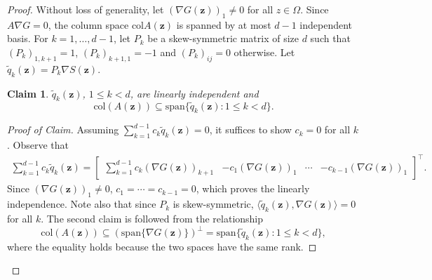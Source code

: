 \documentclass[openacc]{rsproca_new}%
\newcommand{\z}{\bm{z}}
\newtheorem{claim}{Claim}
\begin{document}
\begin{proof}
    Without loss of generality, let $(\nabla G(\z))_1 \ne 0$ for all $z \in \Omega$.
    Since $A\nabla G = 0$, 
    the column space $\text{col} A(\z)$ is spanned by at most $d-1$ independent basis.
    For $k=1,\dots,d-1$, let $P_k$ be a skew-symmetric matrix of size $d$ such that 
    $(P_k)_{1,k+1} = 1$, $(P_k)_{k+1,1}=-1$ and $(P_k)_{ij}=0$ otherwise.
    Let $\tilde{q}_k(\z) = P_k\nabla S(\z)$. 
    \begin{claim}
        $\tilde{q}_k(\z)$, $1\le k <d$, are linearly independent and 
        $$
        \text{col}(A(\z)) \subseteq \text{span}\{\tilde{q}_k(\z) : 1\le k < d\}.
        $$
    \end{claim}
    \begin{proof}[Proof of Claim]
        Assuming $\sum_{k=1}^{d-1} c_k \tilde{q}_k(\z) = 0$,
        it suffices to show $c_k = 0$ for all $k$. 
        Observe that 
        \begin{align*}
        \sum_{k=1}^{d-1} c_k \tilde{q}_k(\z) = \begin{bmatrix}
        \sum_{k=1}^{d-1}c_k (\nabla G(\z))_{k+1} &
        -c_1(\nabla G(\z))_1 & \cdots & -c_{k-1}(\nabla G(\z))_1 
        \end{bmatrix}^\top.
    \end{align*}
        Since $(\nabla G(\z))_1 \ne 0$, $c_1=\cdots = c_{k-1} = 0$, 
        which proves the linearly independence.
        Note also that since $P_k$ is skew-symmetric,
        $\langle \tilde{q}_k(\z), \nabla G(\z)\rangle = 0$ for all $k$.
        The second claim is followed from the relationship
        \begin{equation*}
            \text{col}(A(\z)) \subseteq \left(\text{span}\{\nabla G(\z)\}\right)^\perp = \text{span}\{\tilde{q}_k(\z) : 1\le k < d\},
        \end{equation*}
        where the equality holds because the two spaces have the same rank.
    \end{proof} 
    

\end{proof}
\end{document}

